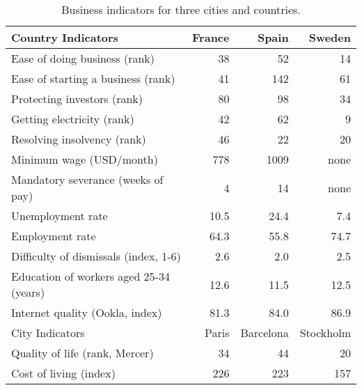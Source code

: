 \documentclass[12pt]{article}
\begin{document}
\bigskip
\begin{table}[h]
\centering
\begin{tabular}{lrrr}
\toprule
Country Indicators & France  & Spain  & Sweden  \\
\midrule
Ease of doing business (rank) &  38  &  52  &  14   \\
Ease of starting a business (rank) &  41  &  142  &  61   \\
Protecting investors (rank)     &  80  &  98    & 34  \\
Getting electricity (rank)      &  42 &  62  &  9 \\
Resolving insolvency (rank)     &  46 &  22 &  20 \\
Minimum wage (USD/month)        &  778 & 1009   &  none \\
Mandatory severance (weeks of pay)        &  4   &  14    & none \\
Unemployment rate               &  10.5  &  24.4   & 7.4  \\
Employment rate                 & 64.3  &  55.8  &  74.7    \\
Difficulty of dismissals (index, 1-6)   &  2.6 & 2.0 & 2.5  \\
Education of workers aged 25-34 (years) &  12.6  &  11.5  &  12.5  \\
Internet quality (Ookla, index)    &  81.3  &  84.0  &  86.9 \\
\midrule
City Indicators & Paris  & Barcelona  & Stockholm  \\
\midrule
Quality of life (rank, Mercer)  &  34  &  44  &  20  \\
Cost of living (index)          & 226  & 223  &  157 \\
\bottomrule
\end{tabular}
\caption{Business indicators for three cities and countries.}
\label{tab:cities}
\end{table}


{\vfill

}
\end{document}
